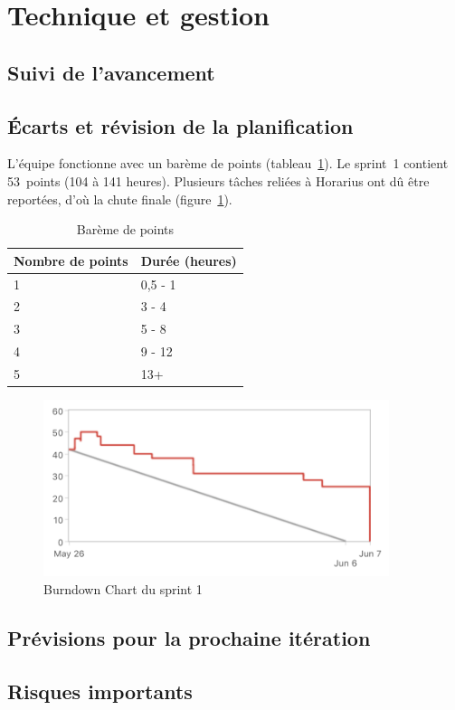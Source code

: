 \section{Technique et gestion}
	\subsection{Suivi de l'avancement}
	

	\subsection{Écarts et révision de la planification}
	L'équipe fonctionne avec un barème de points (tableau~\ref{tab.bareme}). Le sprint~1 contient 53~points (104 à 141 heures). Plusieurs tâches reliées à Horarius ont dû être reportées, d'où la chute finale (figure~\ref{fig.burndowm}).
		
		
	\begin{minipage}{0.5\textwidth}
		\begin{table}[H]
			\centering
			\caption{Barème de points}
			\begin{tabular}{ll}
				\hline
				\bf Nombre de points & \bf Durée (heures) \\
				\hline
				\hline
				1 & 0,5 - 1 	\\
				2 & 3 - 4 	\\
				3 & 5 - 8		\\
				4 & 9 - 12	\\
				5 & 13+ 	\\
				\hline
			\end{tabular}
			\label{tab.bareme}
		\end{table}		
	\end{minipage}%
	\begin{minipage}{0.5\textwidth}
		\begin{figure}[H]
			\centering
			\includegraphics[width=0.9\textwidth]{Figures/burndownChart}
			\caption{Burndown Chart du sprint 1}
			\label{fig.burndowm}
		\end{figure}		
	\end{minipage}


	

	\subsection{Prévisions pour la prochaine itération}
	

	\subsection{Risques importants}
	